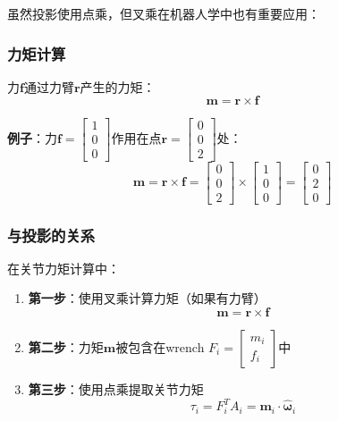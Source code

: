 \documentclass[12pt,a4paper]{article}
\begin{document}
虽然投影使用点乘，但叉乘在机器人学中也有重要应用：

\subsubsection{力矩计算}

力$\bm{f}$通过力臂$\bm{r}$产生的力矩：
\begin{equation}
\bm{m} = \bm{r} \times \bm{f}
\end{equation}

\textbf{例子}：力$\bm{f} = \begin{bmatrix} 1 \\ 0 \\ 0 \end{bmatrix}$作用在点$\bm{r} = \begin{bmatrix} 0 \\ 0 \\ 2 \end{bmatrix}$处：
\begin{equation}
\bm{m} = \bm{r} \times \bm{f} = \begin{bmatrix} 0 \\ 0 \\ 2 \end{bmatrix} \times \begin{bmatrix} 1 \\ 0 \\ 0 \end{bmatrix} = \begin{bmatrix} 0 \\ 2 \\ 0 \end{bmatrix}
\end{equation}

\subsubsection{与投影的关系}

在关节力矩计算中：
\begin{enumerate}
\item \textbf{第一步}：使用叉乘计算力矩（如果有力臂）
\begin{equation}
\bm{m} = \bm{r} \times \bm{f}
\end{equation}

\item \textbf{第二步}：力矩$\bm{m}$被包含在wrench $F_i = \begin{bmatrix} m_i \\ f_i \end{bmatrix}$中

\item \textbf{第三步}：使用点乘提取关节力矩
\begin{equation}
\tau_i = F_i^T A_i = \bm{m}_i \cdot \hat{\bm{\omega}}_i
\end{equation}
\end{enumerate}
\end{document}
